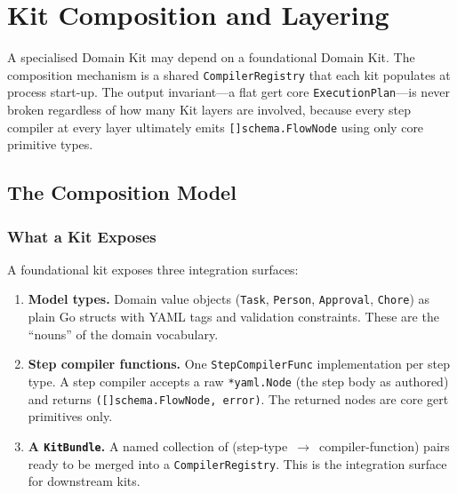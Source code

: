 \section{Kit Composition and Layering}
\label{sec:kit-composition}

A specialised Domain Kit may depend on a foundational Domain Kit.  The
composition mechanism is a shared \texttt{CompilerRegistry} that each kit
populates at process start-up.  The output invariant---a flat gert core
\texttt{ExecutionPlan}---is never broken regardless of how many Kit layers are
involved, because every step compiler at every layer ultimately emits
\texttt{[]schema.FlowNode} using only core primitive types.

\subsection{The Composition Model}
\label{subsec:kit-composition-model}

\subsubsection{What a Kit Exposes}

A foundational kit exposes three integration surfaces:

\begin{enumerate}
  \item \textbf{Model types.}  Domain value objects (\texttt{Task},
    \texttt{Person}, \texttt{Approval}, \texttt{Chore}) as plain Go structs
    with YAML tags and validation constraints.  These are the ``nouns'' of the
    domain vocabulary.

  \item \textbf{Step compiler functions.}  One \texttt{StepCompilerFunc}
    implementation per step type.  A step compiler accepts a raw
    \texttt{*yaml.Node} (the step body as authored) and returns
    \texttt{([]schema.FlowNode, error)}.  The returned nodes are core gert
    primitives only.

  \item \textbf{A \texttt{KitBundle}.}  A named collection of
    (step-type~$\to$~compiler-function) pairs ready to be merged into a
    \texttt{CompilerRegistry}.  This is the integration surface for downstream
    kits.
\end{enumerate}

